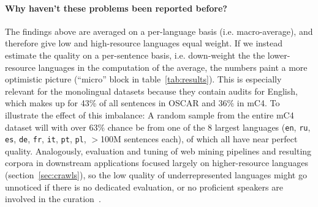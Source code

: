 \paragraph{Why haven't these problems been reported before?}
The findings above are averaged on a per-language basis (i.e. macro-average), and therefore give low and high-resource languages equal weight. If we instead estimate the quality on a per-sentence basis, i.e. down-weight the the lower-resource languages in the computation of the average, the numbers paint a more optimistic picture (``micro'' block in table~\ref{tab:results}). This is especially relevant for the monolingual datasets because they contain audits for English, which makes up for 43\% of all sentences in OSCAR and 36\% in mC4. To illustrate the effect of this imbalance: A random sample from the entire mC4 dataset will with over 63\% chance be from one of the 8 largest languages (\texttt{en}, \texttt{ru}, \texttt{es}, \texttt{de}, \texttt{fr}, \texttt{it}, \texttt{pt}, \texttt{pl}, $>$100M sentences each),%
of which all have near perfect quality. Analogously, evaluation and tuning of web mining pipelines and resulting corpora in downstream applications focused largely on higher-resource languages (section~\ref{sec:crawls}), so the low quality of underrepresented languages might go unnoticed if there is no dedicated evaluation, or no proficient speakers are involved in the curation~\citep{nekoto-etal-2020-participatory}.


